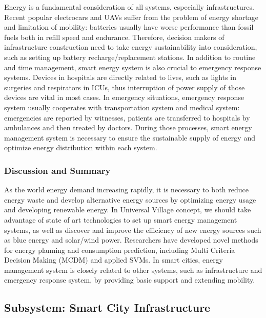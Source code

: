 \documentclass[letterpaper, twocolumn, 10pt, conference]{IEEEtran}
\begin{document}
Energy is a fundamental consideration of all systems, especially infrastructures. Recent popular electrocars and UAVs suffer from the problem of energy shortage and limitation of mobility: batteries usually have worse performance than fossil fuels both in refill speed and endurance. Therefore, decision makers of infrastructure construction need to take energy sustainability into consideration, such as setting up battery recharge/replacement stations.
In addition to routine and time management, smart energy system is also crucial to emergency response systems. Devices in hospitals are directly related to lives, such as lights in surgeries and respirators in ICUs, thus interruption of power supply of those devices are vital in most cases. In emergency situations, emergency response system usually cooperates with transportation system and medical system: emergencies are reported by witnesses, patients are transferred to hospitals by ambulances and then treated by doctors. During those processes, smart energy management system is necessary to ensure the sustainable supply of energy and optimize energy distribution within each system.

\subsubsection{Discussion and Summary}
\label{sssec:cyx:smart_energy:discussion}

As the world energy demand increasing rapidly, it is necessary to both reduce energy waste and develop alternative energy sources by optimizing energy usage and developing renewable energy. In Universal Village concept, we should take advantage of state of art technologies to set up smart energy management systems, as well as discover and improve the efficiency of new energy sources such as blue energy and solar/wind power. Researchers have developed novel methods for energy planning and consumption prediction, including Multi Criteria Decision Making (MCDM) and applied SVMs. In smart cities, energy management system is closely related to other systems, such as infrastructure and emergency response system, by providing basic support and extending mobility.

\subsection{Subsystem: Smart City Infrastructure}
\label{ssec:zlf:smart_infrastructure}
\end{document}
